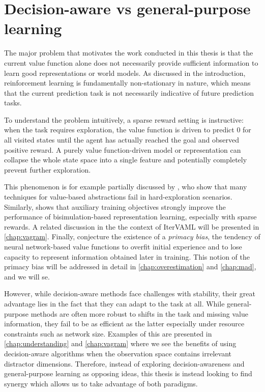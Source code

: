 \section{Decision-aware vs general-purpose learning}

The major problem that motivates the work conducted in this thesis is that the current value function alone does not necessarily provide sufficient information to learn good representations or world models.
As discussed in the introduction, reinforcement learning is fundamentally non-stationary in nature, which means that the current prediction task is not necessarily indicative of future prediction tasks.

To understand the problem intuitively, a sparse reward setting is instructive: when the task requires exploration, the value function is driven to predict $0$ for all visited states until the agent has actually reached the goal and observed positive reward.
A purely value function-driven model or representation can collapse the whole state space into a single feature and potentially completely prevent further exploration.

This phenomenon is for example partially discussed by \textcite{tomar2023learning}, who show that many techniques for value-based abstractions fail in hard-exploration scenarios.
Similarly, \textcite{kemertas2021towards} shows that auxiliary training objectives strongly improve the performance of bisimulation-based representation learning, especially with sparse rewards.
A related discussion in the the context of IterVAML will be presented in \autoref{chap:vagram}.
Finally, \textcite{nikishin2022primacy} conjecture the existence of a \emph{primacy bias}, the tendency of neural network-based value functions to overfit initial experience and to lose capacity to represent information obtained later in training.
This notion of the primacy bias will be addressed in detail in \autoref{chap:overestimation} and \autoref{chap:mad}, and we will se.

However, while decision-aware methods face challenges with stability, their great advantage lies in the fact that they can adapt to the task at all.
While general-purpose methods are often more robust to shifts in the task and missing value information, they fail to be as efficient as the latter especially under resource constraints such as network size.
Examples of this are presented in \autoref{chap:understanding} and \autoref{chap:vagram} where we see the benefits of using decision-aware algorithms when the observation space contains irrelevant distractor dimensions.
Therefore, instead of exploring decision-awareness and general-purpose learning as opposing ideas, this thesis is instead looking to find synergy which allows us to take advantage of both paradigms.
